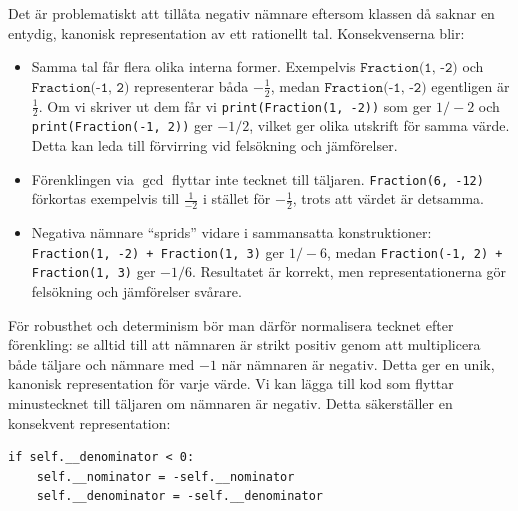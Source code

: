 Det är problematiskt att tillåta negativ nämnare eftersom klassen då saknar en 
entydig, kanonisk representation av ett rationellt tal.
Konsekvenserna blir:

\begin{itemize}
\item Samma tal får flera olika interna former. Exempelvis 
  \(\texttt{Fraction(1, -2)}\) och \(\texttt{Fraction(-1, 2)}\) representerar båda 
  \(-\frac{1}{2}\), medan \(\texttt{Fraction(-1, -2)}\) egentligen är \(\frac{1}{2}\).
  Om vi skriver ut dem får vi
  \texttt{print(Fraction(1, -2))} som ger \(1/-2\) och 
  \texttt{print(Fraction(-1, 2))} ger \(-1/2\), vilket ger olika 
  utskrift för samma värde.
  Detta kan leda till förvirring vid felsökning och jämförelser.
\item Förenklingen via \(\gcd\) flyttar inte tecknet till täljaren. 
  \texttt{Fraction(6, -12)} förkortas exempelvis till 
  \(\frac{1}{-2}\) i stället för \(-\frac{1}{2}\), trots att värdet är 
  detsamma.
\item Negativa nämnare \enquote{sprids} vidare i sammansatta konstruktioner:
  \texttt{Fraction(1, -2) + Fraction(1, 3)} ger \(1/-6\), medan 
  \texttt{Fraction(-1, 2) + Fraction(1, 3)} ger \(-1/6\).
  Resultatet är korrekt, men representationerna gör felsökning och jämförelser 
  svårare.
\end{itemize}

För robusthet och determinism bör man därför normalisera tecknet efter 
förenkling: se alltid till att nämnaren är strikt positiv genom att 
multiplicera både täljare och nämnare med \(-1\) när nämnaren är negativ.
Detta ger en unik, kanonisk representation för varje värde.
Vi kan lägga till kod som flyttar minustecknet till täljaren om nämnaren 
är negativ. Detta säkerställer en konsekvent representation:
\begin{verbatim}
if self.__denominator < 0:
    self.__nominator = -self.__nominator
    self.__denominator = -self.__denominator
\end{verbatim}

